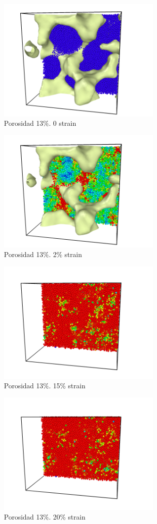 \documentclass[10pt, oneside]{article} %
\begin{document}
\begin{figure}[H]
\centering
\includegraphics[width=8cm]{Figures/18_0strain_color.png}
\caption{Porosidad 13\%. 0 strain}
\end{figure}

\begin{figure}[H]
\centering
\includegraphics[width=8cm]{Figures/18_2strain_color.png}
\caption{Porosidad 13\%. 2\% strain}
\end{figure}

\begin{figure}[H]
\centering
\includegraphics[width=8cm]{Figures/18_15strain_color.png}
\caption{Porosidad 13\%. 15\% strain}
\end{figure}

\begin{figure}[H]
\centering
\includegraphics[width=8cm]{Figures/18_20strain_color.png}
\caption{Porosidad 13\%. 20\% strain}
\end{figure}
\end{document}
